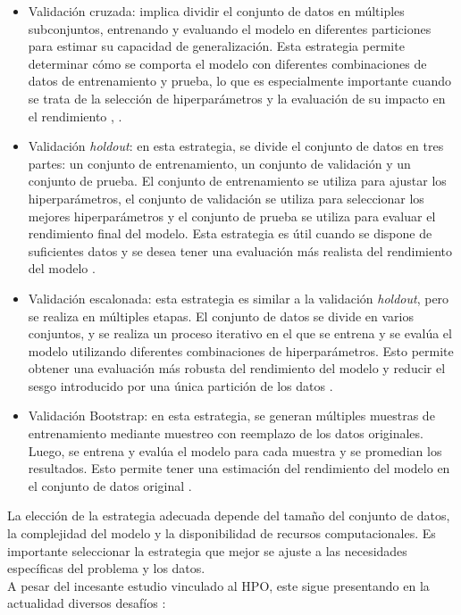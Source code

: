 \begin{itemize}
	\item Validación cruzada: implica dividir el conjunto de datos en múltiples subconjuntos, entrenando y evaluando el modelo en diferentes particiones para estimar su capacidad de generalización. Esta estrategia permite determinar cómo se comporta el modelo con diferentes combinaciones de datos de entrenamiento y prueba, lo que es especialmente importante cuando se trata de la selección de hiperparámetros y la evaluación de su impacto en el rendimiento \citep{hastie2009elements}, \citep{bishop2006pattern}.
	\item Validación \textit{holdout}: en esta estrategia, se divide el conjunto de datos en tres partes: un conjunto de entrenamiento, un conjunto de validación y un conjunto de prueba. El conjunto de entrenamiento se utiliza para ajustar los hiperparámetros, el conjunto de validación se utiliza para seleccionar los mejores hiperparámetros y el conjunto de prueba se utiliza para evaluar el rendimiento final del modelo. Esta estrategia es útil cuando se dispone de suficientes datos y se desea tener una evaluación más realista del rendimiento del modelo \citep{bishop2006pattern}.
	\item Validación escalonada: esta estrategia es similar a la validación \textit{holdout}, pero se realiza en múltiples etapas. El conjunto de datos se divide en varios conjuntos, y se realiza un proceso iterativo en el que se entrena y se evalúa el modelo utilizando diferentes combinaciones de hiperparámetros. Esto permite obtener una evaluación más robusta del rendimiento del modelo y reducir el sesgo introducido por una única partición de los datos \citep{hastie2009elements}.
	\item Validación Bootstrap: en esta estrategia, se generan múltiples muestras de entrenamiento mediante muestreo con reemplazo de los datos originales. Luego, se entrena y evalúa el modelo para cada muestra y se promedian los resultados. Esto permite tener una estimación del rendimiento del modelo en el conjunto de datos original \citep{davison1997bootstrap}.
\end{itemize}
La elección de la estrategia adecuada depende del tamaño del conjunto de datos, la complejidad del modelo y la disponibilidad de recursos computacionales. Es importante seleccionar la estrategia que mejor se ajuste a las necesidades específicas del problema y los datos. \\
A pesar del incesante estudio vinculado al HPO, este sigue presentando en la actualidad diversos desafíos \citep{hutter2019automated}:
